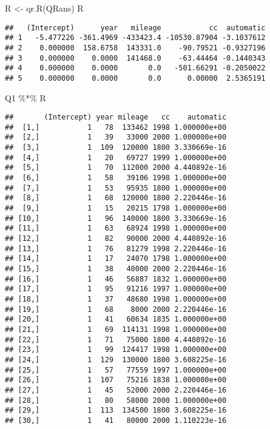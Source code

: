 \documentclass[
]{book}
\newenvironment{Shaded}{\begin{snugshade}}{\end{snugshade}}
\newcommand{\FunctionTok}[1]{\textcolor[rgb]{0.00,0.00,0.00}{#1}}
\newcommand{\NormalTok}[1]{#1}
\newcommand{\OtherTok}[1]{\textcolor[rgb]{0.56,0.35,0.01}{#1}}
\newcommand{\SpecialCharTok}[1]{\textcolor[rgb]{0.00,0.00,0.00}{#1}}
\begin{document}
\begin{Shaded}
\begin{Highlighting}[]
\NormalTok{R }\OtherTok{\textless{}{-}} \FunctionTok{qr.R}\NormalTok{(QRans)}
\NormalTok{R}
\end{Highlighting}
\end{Shaded}

\begin{verbatim}
##   (Intercept)      year   mileage           cc  automatic
## 1   -5.477226 -361.4969 -433423.4 -10530.87904 -3.1037612
## 2    0.000000  158.6758  143331.0    -90.79521 -0.9327196
## 3    0.000000    0.0000  141468.0    -63.44464 -0.1440343
## 4    0.000000    0.0000       0.0   -501.66291 -0.2050022
## 5    0.000000    0.0000       0.0      0.00000  2.5365191
\end{verbatim}

\begin{Shaded}
\begin{Highlighting}[]
\NormalTok{Q1 }\SpecialCharTok{\%*\%}\NormalTok{ R}
\end{Highlighting}
\end{Shaded}

\begin{verbatim}
##       (Intercept) year mileage   cc    automatic
##  [1,]           1   78  133462 1998 1.000000e+00
##  [2,]           1   39   33000 2000 1.000000e+00
##  [3,]           1  109  120000 1800 3.330669e-16
##  [4,]           1   20   69727 1999 1.000000e+00
##  [5,]           1   70  112000 2000 4.440892e-16
##  [6,]           1   58   39106 1998 1.000000e+00
##  [7,]           1   53   95935 1800 1.000000e+00
##  [8,]           1   68  120000 1800 2.220446e-16
##  [9,]           1   15   20215 1798 1.000000e+00
## [10,]           1   96  140000 1800 3.330669e-16
## [11,]           1   63   68924 1998 1.000000e+00
## [12,]           1   82   90000 2000 4.440892e-16
## [13,]           1   76   81279 1998 2.220446e-16
## [14,]           1   17   24070 1798 1.000000e+00
## [15,]           1   38   40000 2000 2.220446e-16
## [16,]           1   46   56887 1832 1.000000e+00
## [17,]           1   95   91216 1997 1.000000e+00
## [18,]           1   37   48680 1998 1.000000e+00
## [19,]           1   68    8000 2000 2.220446e-16
## [20,]           1   41   60634 1835 1.000000e+00
## [21,]           1   69  114131 1998 1.000000e+00
## [22,]           1   71   75000 1800 4.440892e-16
## [23,]           1   99  124417 1998 1.000000e+00
## [24,]           1  129  130000 1800 3.608225e-16
## [25,]           1   57   77559 1997 1.000000e+00
## [26,]           1  107   75216 1838 1.000000e+00
## [27,]           1   45   52000 2000 2.220446e-16
## [28,]           1   80   58000 2000 1.000000e+00
## [29,]           1  113  134500 1800 3.608225e-16
## [30,]           1   41   80000 2000 1.110223e-16
\end{verbatim}
\end{document}
